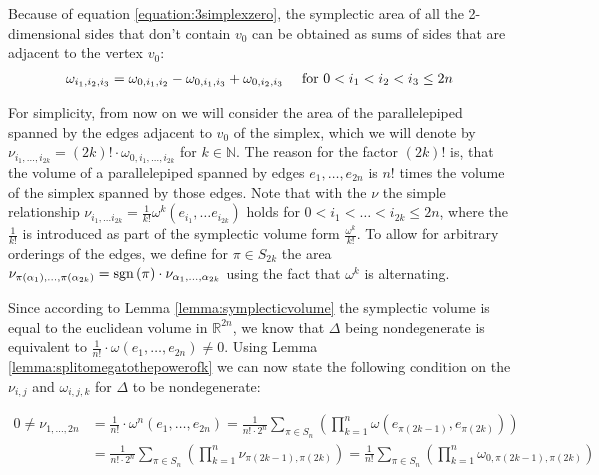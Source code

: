 \documentclass[../SymplecticSimplices.tex]{subfiles}
\begin{document}
Because of equation \eqref{equation:3simplexzero}, the symplectic area of all the 2-dimensional sides that don't contain \( v_0 \) can be obtained as sums of sides that are adjacent to the vertex \( v_0 \):
\begin{equation}
  \label{equation:bordercondition}
  \begin{array}{lr}
    \omega_{i_1, i_2, i_3} = \omega_{0, i_1, i_2} - \omega_{0, i_1, i_3} + \omega_{0, i_2, i_3} & \textnormal{ for } 0 < i_1 < i_2 < i_3 \leq 2n
  \end{array}
\end{equation}

For simplicity, from now on we will consider the area of the parallelepiped spanned by the edges adjacent to \( v_0 \) of the simplex, which we will denote by \( \nu_{i_1, \dots, i_{2k}} = \left( 2k \right)! \cdot \omega_{0, i_1, \dots, i_{2k}} \) for \( k \in \mathbb{N} \). The reason for the factor \( \left( 2k \right) ! \) is, that the volume of a parallelepiped spanned by edges \( e_1, \dots, e_{2n} \) is \( n! \) times the volume of the simplex spanned by those edges. Note that with the \( \nu \) the simple relationship \( \nu_{i_1, \dots i_{2k}} = \frac{1}{k!} \omega^k \left( e_{i_1}, \dots e_{i_{2k}} \right) \) holds for \( 0 < i_1 < \dots < i_{2k} \leq 2n \), where the \( \frac{1}{k!} \) is introduced as part of the symplectic volume form \( \frac{\omega^k}{k!} \). To allow for arbitrary orderings of the edges, we define for \( \pi \in S_{2k} \) the area \( \nu_{\pi \left(\alpha_1\right), \dots, \pi \left(\alpha_{2k}\right)} = \textnormal{sgn} \left( \pi \right) \cdot \nu_{\alpha_1, \dots, \alpha_{2k}} \) using the fact that \( \omega^k \) is alternating.

Since according to Lemma \ref{lemma:symplecticvolume} the symplectic volume is equal to the euclidean volume in \( \mathbb{R}^{2n} \), we know that \( \Delta \) being nondegenerate is equivalent to \( \frac{1}{n!} \cdot \omega \left( e_1, \dots, e_{2n} \right) \neq 0 \). Using Lemma \ref{lemma:splitomegatothepowerofk} we can now state the following condition on the \( \nu_{i,j} \) and \( \omega_{i,j,k} \) for \( \Delta \) to be nondegenerate:

\begin{equation}
\begin{split}
  \label{equation:nondegeneracy}
   0 \neq \nu_{1, \dots, 2n} & = \frac{1}{n!} \cdot \omega^{n} \left( e_1, \dots, e_{2n} \right) = \frac{1}{n!\cdot2^n} \sum\limits_{\pi \in S_n} \left( \prod\limits_{k=1}^{n} \omega \left( e_{\pi \left(2k-1\right)}, e_{\pi \left(2k\right)} \right) \right) \\
                            & = \frac{1}{n!\cdot2^n} \sum\limits_{\pi \in S_n} \left( \prod\limits_{k=1}^{n} \nu_{\pi \left(2k-1\right), \pi \left(2k\right)} \right) = \frac{1}{n!} \sum\limits_{\pi \in S_n} \left( \prod\limits_{k=1}^{n} \omega_{0, \pi \left(2k-1\right), \pi \left(2k\right)} \right)
\end{split}
\end{equation}
\end{document}
